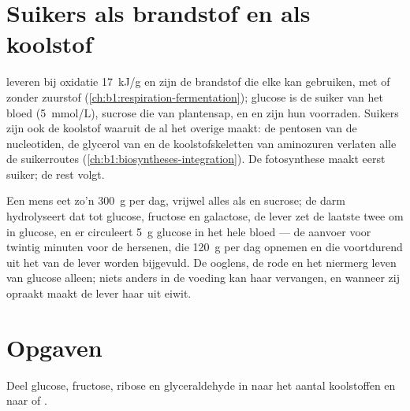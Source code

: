 \section{Suikers als brandstof en als koolstof}

\begin{proposition}\label{prop:b1:carbohydrates:fuel}
 leveren bij oxidatie \qty{17}{kJ/g} en zijn de brandstof die elke 
kan gebruiken, met of zonder zuurstof
(\cref{ch:b1:respiration-fermentation}); glucose is de suiker van het bloed
(\qty{5}{mmol/L}), sucrose die van plantensap, en  en  zijn hun
voorraden. Suikers zijn ook de koolstof waaruit de  al het overige maakt: de
pentosen van de nucleotiden, de glycerol van  en de koolstofskeletten van
aminozuren verlaten alle de suikerroutes
(\cref{ch:b1:biosyntheses-integration}). De fotosynthese maakt eerst suiker; de
rest volgt.
\end{proposition}

\begin{example}\label{ex:b1:carbohydrates:day}
Een mens eet zo'n \qty{300}{g}  per dag, vrijwel alles als  en
sucrose; de darm hydrolyseert dat tot glucose, fructose en galactose, de lever
zet de laatste twee om in glucose, en er circuleert \qty{5}{g} glucose in het hele
bloed --- de aanvoer voor twintig minuten voor de hersenen, die \qty{120}{g} per
dag opnemen en die voortdurend uit het  van de lever worden bijgevuld. De
ooglens, de rode  en het niermerg leven van glucose alleen; niets anders in
de voeding kan haar vervangen, en wanneer zij opraakt maakt de lever haar uit
eiwit.
\end{example}

\section{Opgaven}

\begin{exercise}[$\star$]\label{exo:b1:carbohydrates:1}
Deel glucose, fructose, ribose en glyceraldehyde in naar het aantal koolstoffen
en naar  of .
\end{exercise}

